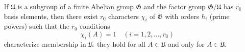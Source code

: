 If $\mathfrak{U}$ is a subgroup of a finite Abelian group $\mathfrak{G}$ and the factor group $\mathfrak{G}/\mathfrak{U}$ has $r_0$ basis elements, then there exist $r_0$ characters $\chi_i$ of $\mathfrak{G}$ with orders $h_i$ (prime powers) such that the $r_0$ conditions
$$\chi_i(A) = 1 \quad (i = 1, 2, \ldots, r_0)$$
characterize membership in $\mathfrak{U}$: they hold for all $A \in \mathfrak{U}$ and only for $A \in \mathfrak{U}$.

